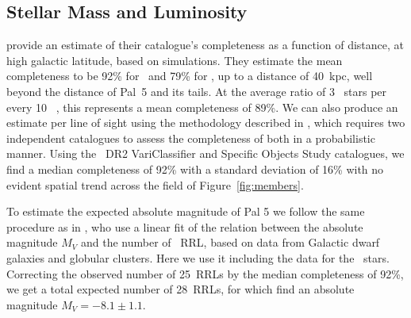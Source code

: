 \documentclass[twocolumn]{aastex63}
\begin{document}
\subsection{Stellar Mass and Luminosity}


\citet{Sesar:2017b} provide an estimate of their catalogue's completeness as a function of distance, at high galactic latitude, based on simulations. They estimate the mean completeness to be 92\% for \rrab~and 79\% for \rrc, up to a distance of 40~kpc, well beyond the distance of Pal~5 and its tails. At the average ratio of 3 \rrc~stars per every 10 \rrab~\citep{Layden1995}, this represents a mean completeness of 89\%. We can also produce an estimate per line of sight using the methodology described in \citet{Rybizki2018}, which requires two independent catalogues to assess the completeness of both in a probabilistic manner. Using the \Gaia~DR2 VariClassifier \citet{Holl2018,Rimoldini2018} and Specific Objects Study \citep{Clementini2018} catalogues, we find a median completeness of 92\% with a standard deviation of 16\%  with no evident spatial trend across the field of Figure~\ref{fig:members}.


To estimate the expected absolute magnitude of Pal 5 we follow the same procedure as in \citet{Mateu:2018}, who use a linear fit of the relation between the absolute magnitude $M_V$ and the number of \typeab\ RRL, based on data from Galactic dwarf galaxies and globular clusters. Here we use it including the data for the \typec~stars.
Correcting the observed number of 25~RRLs by the median completeness of 92\%, we get a total expected number of 28~RRLs, for which find an absolute magnitude $M_V=-8.1\pm 1.1$.

\end{document}
